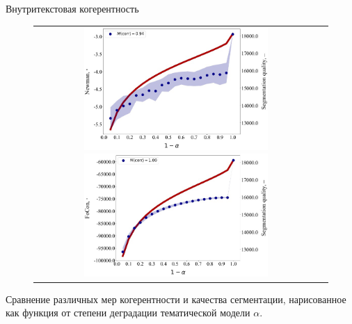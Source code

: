 \begin{frame}{Внутритекстовая когерентность}

\begin{figure}
\begin{tabular}{cc}
    \includegraphics[width=70mm]{images/segm_mimno.png}
\includegraphics[width=70mm]{images/segm_focon.png} \\
\end{tabular}
\end{figure}

Сравнение различных мер когерентности и качества сегментации, нарисованное как функция от степени деградации тематической модели $\alpha$.

\end{frame}

